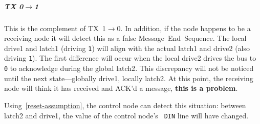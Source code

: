 \subparagraph{TX 0$\rightarrow$1}
\label{reset-phi1-tx-0-1}
This is the complement of TX~1$\rightarrow$0. In addition, if the node happens
to be a receiving node it will detect this as a false Message~End~Sequence.
The local {\sc drive1} and {\sc latch1} (driving {\tt 1}) will align with the
actual {\sc latch1} and {\sc drive2} (also driving {\tt 1}). The first
difference will occur when the local {\sc drive2} drives the bus to {\tt 0} to
acknowledge during the global {\sc latch2}. This discrepancy will not be
noticed until the next state---globally {\sc drive1}, locally {\sc latch2}. At
this point, the receiving node will think it has received and ACK'd a message,
\textbf{this is a problem}.

Using~\ref{reset-assumption}, the control node can detect this situation:
between {\sc latch2} and {\sc drive1}, the value of the control node's {\tt
DIN} line will have changed.


